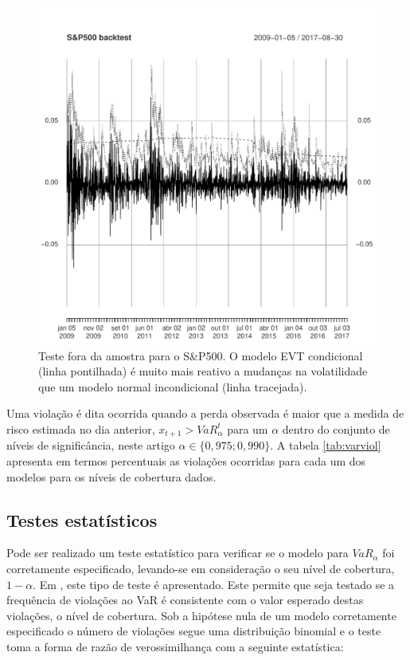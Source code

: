 \documentclass[1p]{elsarticle}
\theoremstyle{definition}
\begin{document}
\begin{figure}[H]
	\centering
	\includegraphics[width=1\linewidth]{figs/artigo-sp500backtest}
	\caption{Teste fora da amostra para o S\&P500. O modelo EVT condicional (linha pontilhada) é muito mais reativo a mudanças na volatilidade que um modelo normal incondicional (linha tracejada).}
	\label{fig:artigo-sp500backtest}
\end{figure}

Uma violação é dita ocorrida quando a perda observada é maior que a medida de risco estimada no dia anterior, $x_{t+1}>VaR^t_\alpha$ para um $\alpha$ dentro do conjunto de níveis de significância, neste artigo $\alpha \in \{0,975; 0,990\}$. A tabela \ref{tab:varviol} apresenta em termos percentuais as violações ocorridas para cada um dos modelos para os níveis de cobertura dados.

\subsection{Testes estatísticos}
\label{sec:testes}

Pode ser realizado um teste estatístico para verificar se o modelo para $VaR_\alpha$ foi corretamente especificado, levando-se em consideração o seu nível de cobertura, $1-\alpha$. Em \cite{Kupiec1995}, este tipo de teste é apresentado. Este permite que seja testado se a frequência de violações ao VaR é consistente com o valor esperado destas violações, o nível de cobertura. Sob a hipótese nula de um modelo corretamente especificado o número de violações segue uma distribuição binomial e o teste toma a forma de razão de verossimilhança com a seguinte estatística:
\end{document}
